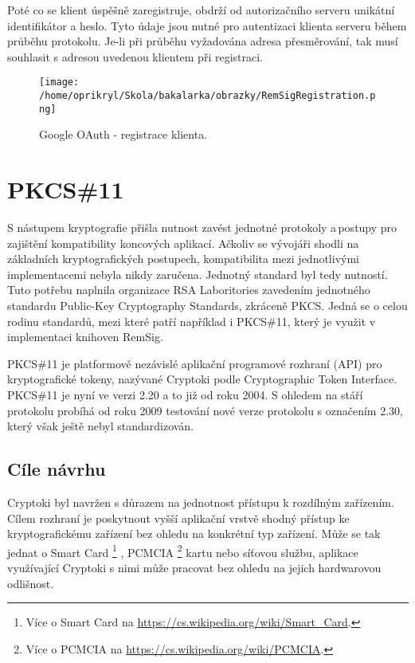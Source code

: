 \documentclass[]{fithesis3}
\begin{document}
	Poté co se klient úspěšně zaregistruje, obdrží od autorizačního serveru unikátní identifikátor a 		heslo. Tyto údaje jsou nutné pro autentizaci klienta serveru během průběhu protokolu. Je-li při 		průběhu vyžadována adresa přesměrování, tak musí souhlasit s adresou uvedenou klientem při 	registraci.

	\begin{figure}[!ht]
  		\begin{minipage}{1.00\textwidth}
    			\texttt{[image: /home/oprikryl/Skola/bakalarka/obrazky/RemSigRegistration.png]}
  		\end{minipage}
 		\caption{Google OAuth - registrace klienta.}
  		\label{fig:Google OAuth - registrace klienta.}
	\end{figure}	
	\newpage

\chapter{PKCS\#11}

S nástupem kryptografie přišla nutnost zavést jednotné protokoly a\,postupy pro zajištění kompatibility koncových aplikací. Ačkoliv se vývojáři shodli na základních kryptografických postupech, kompatibilita mezi jednotlivými implementacemi nebyla nikdy zaručena. Jednotný standard byl tedy nutností. Tuto potřebu naplnila organizace RSA Laboritories zavedením jednotného standardu Public-Key Cryptography Standards, zkráceně PKCS. Jedná se o celou rodinu standardů, mezi které patří například i PKCS\#11, který je využit v\,implementaci knihoven RemSig.

PKCS\#11 je platformově nezávislé aplikační programové rozhraní (API) pro kryptografické tokeny, nazývané Cryptoki podle Cryptographic Token Interface. PKCS\#11 je nyní ve verzi 2.20 a to již od roku 2004. S ohledem na stáří protokolu probíhá od roku 2009 testování nové verze protokolu s označením 2.30, který však ještě nebyl standardizován.

	\section{Cíle návrhu}

	Cryptoki byl navržen s důrazem na jednotnost přístupu k rozdílným zařízením. Cílem rozhraní je 		poskytnout vyšší aplikační vrstvě shodný přístup ke kryptografickému zařízení bez ohledu na 		konkrétní typ zařízení. Může se tak jednat o 
	Smart Card \footnote{Více o Smart Card na \url{https://cs.wikipedia.org/wiki/Smart_Card}.} 
	, 
	PCMCIA \footnote{Více o PCMCIA na \url{https://cs.wikipedia.org/wiki/PCMCIA}.} 
	kartu nebo síťovou službu, aplikace využívající Cryptoki s nimi může pracovat bez ohledu na 		jejich hardwarovou odlišnost.
\end{document}
